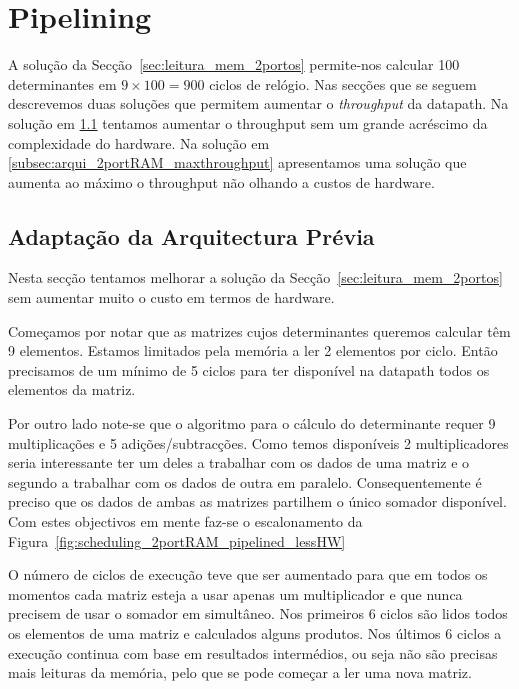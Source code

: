 \documentclass[a4paper]{article}
\begin{document}
\section{Pipelining}

A solução da Secção~\ref{sec:leitura_mem_2portos} permite-nos calcular 100 determinantes em $ 9 \times 100 = 900 $ ciclos de relógio. Nas secções que se seguem descrevemos duas soluções que permitem aumentar o \textit{throughput} da datapath. Na solução em \ref{subsec:arqui_2portRAM_pipelined_lessHW} tentamos aumentar o throughput sem um grande acréscimo da complexidade do hardware. Na solução em \ref{subsec:arqui_2portRAM_maxthroughput} apresentamos uma solução que aumenta ao máximo o throughput não olhando a custos de hardware.

\subsection{Adaptação da Arquitectura Prévia}
\label{subsec:arqui_2portRAM_pipelined_lessHW}

Nesta secção tentamos melhorar a solução da Secção~\ref{sec:leitura_mem_2portos} sem aumentar muito o custo em termos de hardware.

Começamos por notar que as matrizes cujos determinantes queremos calcular têm 9 elementos. Estamos limitados pela memória a ler 2 elementos por ciclo. Então precisamos de um mínimo de 5 ciclos para ter disponível na datapath todos os elementos da matriz.

Por outro lado note-se que o algoritmo para o cálculo do determinante requer 9 multiplicações e 5 adições/subtracções. Como temos disponíveis 2 multiplicadores seria interessante ter um deles a trabalhar com os dados de uma matriz e o segundo a trabalhar com os dados de outra em paralelo. Consequentemente é preciso que os dados de ambas as matrizes partilhem o único somador disponível. Com estes objectivos em mente faz-se o escalonamento da Figura~\ref{fig:scheduling_2portRAM_pipelined_lessHW}

O número de ciclos de execução teve que ser aumentado para que em todos os momentos cada matriz esteja a usar apenas um multiplicador e que nunca precisem de usar o somador em simultâneo. Nos primeiros 6 ciclos são lidos todos os elementos de uma matriz e calculados alguns produtos. Nos últimos 6 ciclos a execução continua com base em resultados intermédios, ou seja não são precisas mais leituras da memória, pelo que se pode começar a ler uma nova matriz.
\end{document}
